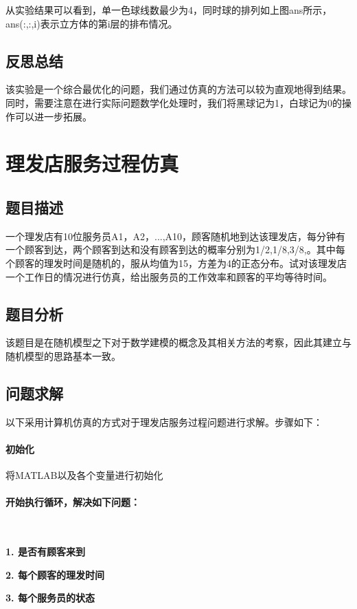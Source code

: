 \documentclass[UTF8]{ctexart}
\begin{document}
    从实验结果可以看到，单一色球线数最少为4，同时球的排列如上图ans所示，ans(:,:,i)表示立方体的第i层的排布情况。

    \subsection{反思总结}
    该实验是一个综合最优化的问题，我们通过仿真的方法可以较为直观地得到结果。同时，需要注意在进行实际问题数学化处理时，我们将黑球记为1，白球记为0的操作可以进一步拓展。

    \section{理发店服务过程仿真}
    \subsection{题目描述}
    一个理发店有10位服务员A1，A2，...,A10，顾客随机地到达该理发店，每分钟有一个顾客到达，两个顾客到达和没有顾客到达的概率分别为1/2,1/8,3/8,。其中每个顾客的理发时间是随机的，服从均值为15，方差为4的正态分布。试对该理发店一个工作日的情况进行仿真，给出服务员的工作效率和顾客的平均等待时间。

    \subsection{题目分析}
    该题目是在随机模型之下对于数学建模的概念及其相关方法的考察，因此其建立与随机模型的思路基本一致。

    \subsection{问题求解}
    以下采用计算机仿真的方式对于理发店服务过程问题进行求解。步骤如下：

    \paragraph{初始化}  将MATLAB以及各个变量进行初始化

    \paragraph{开始执行循环，解决如下问题：}

    ~

    \textbf{1. 是否有顾客来到}

    \textbf{2. 每个顾客的理发时间}

    \textbf{3. 每个服务员的状态}
\end{document}
